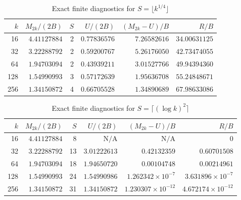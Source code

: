 \documentclass[11pt,letterpaper]{article}
\theoremstyle{remark}\newtheorem{remark}[theorem]{Remark}
\theoremstyle{definition}\newtheorem{definition}[theorem]{Definition}
\begin{document}
\begin{table}[htbp]\centering\small\setlength{\tabcolsep}{4pt}
\caption{Exact finite diagnostics for $S=\lfloor k^{1/4}\rfloor$}\label{sgm:dv:tab:quarter}
\begin{tabular}{@{}rrrrrr@{}}
\toprule
$k$ & $M_{2k}/(2B)$ & $S$ & $U/(2B)$ & $(M_{2k}-U)/B$ & $R/B$ \\
\midrule
16 & $4.41127884$ & 2 & $0.77836576$ & $7.26582616$ & $34.00631125$ \\
32 & $3.22288792$ & 2 & $0.59200767$ & $5.26176050$ & $42.73474055$ \\
64 & $1.94703094$ & 2 & $0.43939211$ & $3.01527766$ & $49.94394360$ \\
128 & $1.54990993$ & 3 & $0.57172639$ & $1.95636708$ & $55.24848671$ \\
256 & $1.34150872$ & 4 & $0.66705528$ & $1.34890689$ & $67.98633086$ \\
\bottomrule
\end{tabular}
\end{table}
\begin{table}[htbp]\centering\small\setlength{\tabcolsep}{4pt}
\caption{Exact finite diagnostics for $S=\lceil(\log k)^2\rceil$}\label{sgm:dv:tab:logsquared}
\begin{tabular}{@{}rrrrrr@{}}
\toprule
$k$ & $M_{2k}/(2B)$ & $S$ & $U/(2B)$ & $(M_{2k}-U)/B$ & $R/B$ \\
\midrule
16 & $4.41127884$ & 8 & $\text{N/A}$ & $\text{N/A}$ & $0$ \\
32 & $3.22288792$ & 13 & $3.01222613$ & $0.42132359$ & $0.60701508$ \\
64 & $1.94703094$ & 18 & $1.94650720$ & $0.00104748$ & $0.00214961$ \\
128 & $1.54990993$ & 24 & $1.54990986$ & $1.262342\!\times\!10^{-7}$ & $3.631896\!\times\!10^{-7}$ \\
256 & $1.34150872$ & 31 & $1.34150872$ & $1.230307\!\times\!10^{-12}$ & $4.672174\!\times\!10^{-12}$ \\
\bottomrule
\end{tabular}
\end{table}
\end{document}
